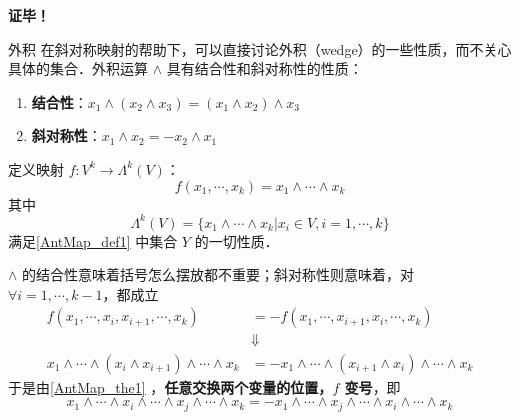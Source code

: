 \textbf{证毕！}
\begin{example}{外积}\label{AntMap_ex1}
在斜对称映射的帮助下，可以直接讨论外积（wedge）的一些性质，而不关心具体的集合．外积运算 $\wedge$ 具有结合性和斜对称性的性质：
\begin{enumerate}
\item \textbf{结合性}：$x_1\wedge(x_2\wedge x_3)=(x_1\wedge x_2)\wedge x_3$
\item \textbf{斜对称性}：$x_1\wedge x_2=-x_2\wedge x_1$
\end{enumerate}

定义映射 $f:V^k\rightarrow \Lambda^k(V)$：
\begin{equation}
f(x_1,\cdots,x_k)=x_1\wedge\cdots\wedge x_k
\end{equation}
其中
\begin{equation}
\Lambda^k(V)=\{x_1\wedge\cdots\wedge x_k| x_i\in V,i=1,\cdots,k\}
\end{equation}
满足\autoref{AntMap_def1} 中集合 $Y$ 的一切性质．

$\wedge$ 的结合性意味着括号怎么摆放都不重要；斜对称性则意味着，对 $\forall i=1,\cdots,k-1$，都成立
\begin{equation}
\begin{aligned}
f(x_1,\cdots,x_i,x_{i+1},\cdots,x_k)&=-f(x_1,\cdots,x_{i+1},x_i,\cdots,x_k)\\
&\Downarrow\\
x_1\wedge\cdots\wedge (x_i\wedge x_{i+1})\wedge\cdots\wedge x_k&=-x_1\wedge\cdots\wedge (x_{i+1}\wedge x_{i})\wedge\cdots\wedge x_k
\end{aligned}
\end{equation}
于是由\autoref{AntMap_the1} ，\textbf{任意交换两个变量的位置，$f$ 变号}，即
\begin{equation}
x_1\wedge\cdots\wedge x_i\wedge\cdots\wedge x_j\wedge\cdots\wedge x_k=-x_1\wedge\cdots\wedge x_j\wedge\cdots\wedge x_i\wedge\cdots\wedge x_k
\end{equation}


\end{example}
